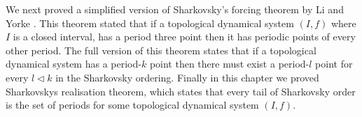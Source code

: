 \begin{center}
\end{center}
We next proved a simplified version of Sharkovsky's forcing theorem by Li and Yorke \cite{li-yorke}. This theorem stated that if a topological dynamical system $(I, f)$ where $I$ is a closed interval, has a period three point then it has periodic points of every other period. The full version of this theorem states that if a topological dynamical system has a period-$k$ point then there must exist a period-$l$ point for every $l \lhd k$ in the Sharkovsky ordering. Finally in this chapter we proved Sharkovskys realisation theorem, which states that every tail of Sharkovsky order is the set of periods for some topological dynamical system $(I, f)$. 

